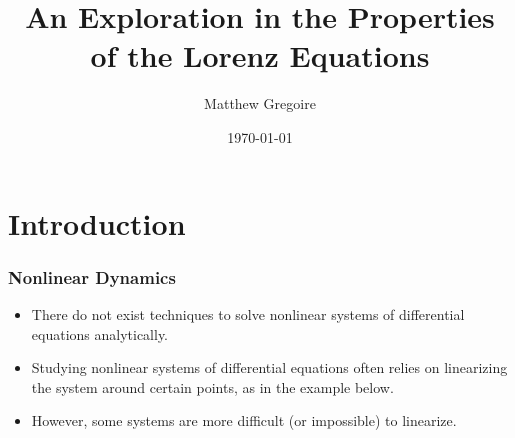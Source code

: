 \documentclass{beamer}
\title[Lorenz System]{An Exploration in the Properties of the Lorenz Equations} %
\author{Matthew Gregoire} %
\institute[UNC] %
{
    University of North Carolina at Chapel Hill \\ %
    \medskip
    \textit{mattyg@live.unc.edu} %
}
\date{\today} %
\begin{document}
\begin{frame}
    \titlepage %
\end{frame}


\section{Introduction}

\begin{frame}
    \frametitle{Nonlinear Dynamics}
    \begin{itemize}
        \item{There do not exist techniques to solve nonlinear systems of differential equations analytically.}
        \item{Studying nonlinear systems of differential equations often relies on linearizing the system around certain points, as in the example below.}
        \item{However, some systems are more difficult (or impossible) to linearize.}
    \end{itemize}


\end{frame}
\end{document}
